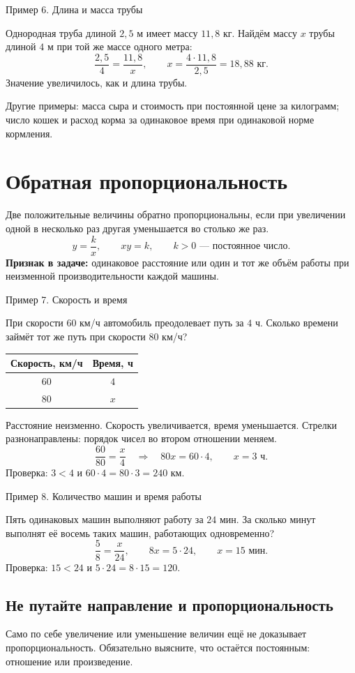 \documentclass[a4paper,12pt]{article}
\newcommand{\ex}[1]{\par\medskip\textcolor{darkaccent}{#1}\par\smallskip}
\begin{document}
\ex{Пример 6. Длина и масса трубы}
Однородная труба длиной $2,5$ м имеет массу $11,8$ кг. Найдём массу $x$ трубы длиной $4$ м при той же массе одного метра:
\[
\frac{2,5}{4}=\frac{11,8}{x},\qquad x=\frac{4\cdot11,8}{2,5}=18,88\text{ кг}.
\]
Значение увеличилось, как и длина трубы.

Другие примеры: масса сыра и стоимость при постоянной цене за килограмм; число кошек и расход корма за одинаковое время при одинаковой норме кормления.

\clearpage
\section{Обратная пропорциональность}
Две положительные величины обратно пропорциональны, если при увеличении одной в несколько раз другая уменьшается во столько же раз.
\[
y=\frac{k}{x},\qquad xy=k,\qquad k>0\text{ --- постоянное число}.
\]
\textbf{Признак в задаче:} одинаковое расстояние или один и тот же объём работы при неизменной производительности каждой машины.
\ex{Пример 7. Скорость и время}
При скорости $60$ км/ч автомобиль преодолевает путь за $4$ ч. Сколько времени займёт тот же путь при скорости $80$ км/ч?
\begin{center}
\begin{tabular}{cc}
\toprule
Скорость, км/ч & Время, ч\\\midrule
$60$ & $4$\\
$80$ & $x$\\\bottomrule
\end{tabular}
\qquad
{}
\end{center}
Расстояние неизменно. Скорость увеличивается, время уменьшается. Стрелки разнонаправлены: порядок чисел во втором отношении меняем.
\[
\frac{60}{80}=\frac{x}{4}
\quad\Longrightarrow\quad80x=60\cdot4,
\qquad x=3\text{ ч}.
\]
Проверка: $3<4$ и $60\cdot4=80\cdot3=240$ км.
\ex{Пример 8. Количество машин и время работы}
Пять одинаковых машин выполняют работу за $24$ мин. За сколько минут выполнят её восемь таких машин, работающих одновременно?
\[
\frac58=\frac{x}{24},\qquad 8x=5\cdot24,\qquad x=15\text{ мин}.
\]
Проверка: $15<24$ и $5\cdot24=8\cdot15=120$.
\subsection{Не путайте направление и пропорциональность}
Само по себе увеличение или уменьшение величин ещё не доказывает пропорциональность. Обязательно выясните, что остаётся постоянным: отношение или произведение.
\end{document}
